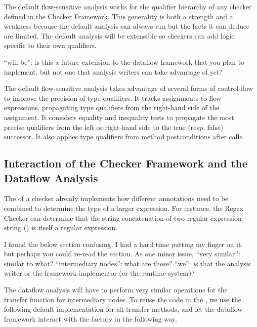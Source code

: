 The default flow-sensitive analysis  works for the qualifier hierarchy of any checker defined in 
the Checker Framework.  This generality is both a strength and a weakness because the 
default analysis can
always run but the facts it can deduce are limited.  The default analysis
will be extensible so checkers can add logic specific to their own qualifiers.

\begin{workinprogress}
``will be'':  is this a future extension to the dataflow framework that you
plan to implement, but not one that analysis writers can take advantage of yet?
\end{workinprogress}

The default flow-sensitive analysis takes advantage of several forms of control-flow to improve the precision of type qualifiers.  It tracks assignments to flow expressions, propagating type qualifiers from the right-hand side of the assignment.  It considers equality and inequality tests to propagate the most precise qualifiers from the left or right-hand side to the true (resp. false) successor.  It also applies type qualifiers from method postconditions after calls.



\subsection{Interaction of the Checker Framework and the Dataflow Analysis}
\label{sec:flow-cf-interaction}

The  of a checker already implements how different annotations
need to be combined to determine the type of a larger expression.  For instance,
the Regex Checker can determine that the string concatenation of two regular expression
string () is itself a regular expression.

\begin{workinprogress}
I found the below section confusing.  I had a hard time putting my finger
on it, but perhaps you could re-read the section.  As one minor issue,
``very similar'':  similar to what?  ``intermediary nodes'':  what are
those?  ``we'':  is that the analysis writer or the framework implementor
(or the runtime system)?
\end{workinprogress}

The dataflow analysis will have to perform very similar operations for the transfer function
for intermediary nodes.  To reuse the code in the , we
use the following default implementation for all transfer methods, and let
the dataflow framework interact with the factory in the following way.

